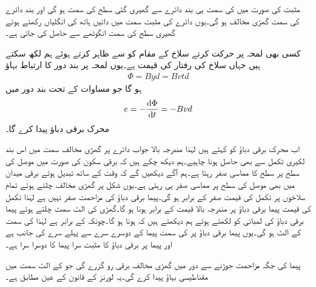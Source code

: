 مثبت  کی صورت میں  کی سمت ہی بند دائرے سے گھیری گئی سطح کی سمت ہو گی اور بند دائرے کی سمت گھڑی مخالف ہو گی۔یوں دائرے کی مثبت سمت میں دائیں ہاتھ کی انگلیاں رکھتے ہوئے گھیری سطح کی سمت انگوٹھے سے حاصل کی جاتی ہے۔ 

کسی بھی لمحہ  پر حرکت کرتے سلاخ کے مقام کو  سے ظاہر کرتے ہوئے ہم  لکھ سکتے ہیں جہاں  سلاخ کی رفتار کی قیمت ہے۔یوں لمحہ  پر بند دور کا ارتباط بہاؤ
\begin{align*}
\Phi=B y d =B  v t d
\end{align*} 
ہو گا جو مساوات  کے تحت بند دور میں
\begin{align*}
e=-\frac{\dif \Phi}{\dif t}=-B v d
\end{align*}
محرک برقی دباؤ  پیدا کرے گا۔

اب محرک برقی دباؤ  کو کہتے ہیں لہٰذا مندرجہ بالا جواب دائرے پر گھڑی مخالف سمت میں اس بند لکیری تکمل سے بھی حاصل ہونا چاہیے۔ہم دیکھ چکے ہیں کہ برقی سکون کی صورت میں موصل کی سطح پر سطح کا مماسی   صفر رہتا  ہے۔ہم آگے دیکھیں گے کہ وقت کے ساتھ تبدیل ہوتے برقی میدان میں بھی موصل کی سطح پر مماسی  صفر ہی رہتی ہے۔یوں شکل  پر گھڑی مخالف چلتے ہوئے تمام سلاخوں پر تکمل کی قیمت صفر کے برابر ہو گی۔پیما برقی دباؤ کی مزاحمت صفر نہیں ہے لہٰذا تکمل کی قیمت پیما برقی دباؤ پر مندرجہ بالا قیمت کے برابر ہونا ہو گا۔گھڑی کی الٹ سمت چلتے ہوئے پیما برقی دباؤ کی لمبائی کو  لکھتے ہوئے ہم دیکھتے ہیں کہ  ہونا ہو گا۔چونکہ  کے برابر ہے لہٰذا  کی سمت  کے الٹ ہو گی۔یوں پیما برقی دباؤ پر  کی سمت پیما کے دوسرے سرے سے پہلے سرے کی جانب ہے اور پیما پر برقی دباؤ کا مثبت سرا پیما کا دوسرا سرا ہے۔

پیما کی جگہ مزاحمت جوڑنے سے دور میں گھڑی مخالف برقی رو گزرے گی جو  کے الٹ سمت میں مقناطیسی بہاؤ پیدا کرے گی۔یہ لورنز کے قانون کے عین مطابق ہے۔

